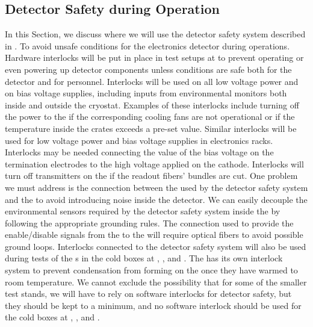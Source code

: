 \subsection{Detector Safety during Operation}
\label{sec:fdsp-tpcelec-safety-detops}

In this Section, we discuss where we will use
the detector safety system described in \tcchesh.
To avoid unsafe conditions for the  electronics detector 
during operations. Hardware interlocks will be put in place
in test setups at  to prevent operating or even powering up
detector components 
unless conditions are safe
both for the detector and for personnel. Interlocks will be
used on all low voltage power and on bias voltage 
supplies, including inputs from environmental monitors both
inside and outside the cryostat. Examples of these interlocks include turning off the power to the 
if the corresponding cooling fans are not operational or
if the temperature inside the crates exceeds a pre-set value.
Similar interlocks will be used for low voltage power
and bias voltage supplies in  electronics racks.
Interlocks may be needed connecting the value of the 
bias voltage on the  termination electrodes to the
high voltage applied on the  cathode. Interlocks will turn 
off transmitters on the  if the readout fibers'
bundles are cut. One problem we must address is 
the connection between the  used by the detector 
safety system and the  to avoid introducing noise 
inside the detector. We can easily decouple the environmental 
sensors required by the detector safety system inside the 
 by following the appropriate grounding rules. 
The connection used to provide the enable/disable signals 
from the  to the  will require optical 
fibers to avoid possible ground loops. Interlocks connected
to the detector safety system will also be used during tests 
of the s in the cold boxes at , ,
and . The  has its own interlock system to
prevent condensation from forming on the  once
they have warmed to room temperature. We cannot exclude the possibility that for some of the smaller test stands, we will 
have to rely on software interlocks for detector safety,
but they should be kept to a minimum, and no software
interlock should be used for the cold boxes at
, ,
and .
